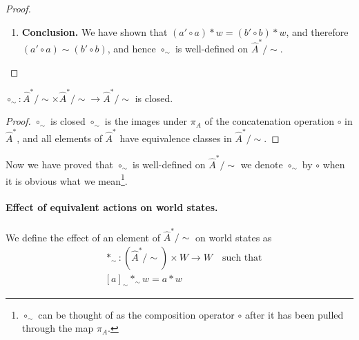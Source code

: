 \begin{proof}
\begin{enumerate}[(1)]
    \item \textbf{Conclusion.}
    We have shown that $(a' \circ a) \ast w = (b' \circ b) \ast w$, and therefore $(a' \circ a) \sim (b' \circ b)$, and hence $\circ_{\sim}$ is well-defined on $\hat{A}^{\ast}/\sim$.
    \end{enumerate}
    
\end{proof}

\begin{proposition}\label{prp:circ_sim_closed}
    $\circ_{\sim}: \hat{A}^{\ast}/\sim \times \hat{A}^{\ast}/\sim \to \hat{A}^{\ast}/\sim$ is closed.
\end{proposition}
\begin{proof}
    $\circ_{\sim}$ is closed $\circ_{\sim}$ is the images under $\pi_{A}$ of the concatenation operation $\circ$ in $\hat{A}^{\ast}$, and all elements of $\hat{A}^{\ast}$ have equivalence classes in $\hat{A}^{\ast}/\sim$.
\end{proof}


Now we have proved that $\circ_{\sim}$ is well-defined on $\hat{A}^{\ast}/\sim$ we denote $\circ_{\sim}$ by $\circ$ when it is obvious what we mean\footnote{$\circ_{\sim}$ can be thought of as the composition operator $\circ$ after it has been pulled through the map $\pi_{A}$.}.

\paragraph{Effect of equivalent actions on world states.}
We define the effect of an element of  $\hat{A}^{\ast}/\sim$ on world states as
\begin{equation}
\begin{aligned}
    & \ast_{\sim}: (\hat{A}^{\ast}/\sim) \times W \to W \quad \text{such that} \\
    & [a]_{\sim} \ast_{\sim} w = a \ast w
\end{aligned}
\end{equation}

